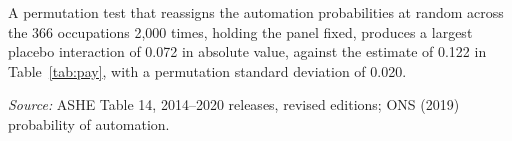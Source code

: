 \begin{table}[!ht]
\begin{threeparttable}
\begin{tablenotes}
A permutation test that reassigns the automation probabilities at random across the 366 occupations 2,000 times, holding the panel fixed, produces a largest placebo interaction of 0.072 in absolute value, against the estimate of 0.122 in Table~\ref{tab:pay}, with a permutation standard deviation of 0.020.
\item \emph{Source:} ASHE Table 14, 2014--2020 releases, revised editions; ONS (2019) probability of automation.
\end{tablenotes}\end{threeparttable}\end{table}